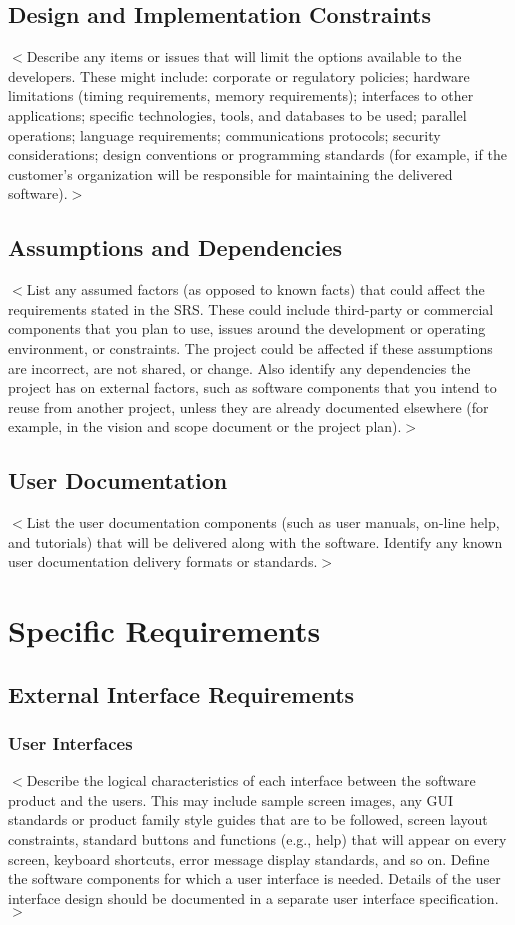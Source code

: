 \documentclass[a4paper, 11pt]{scrreprt}
\begin{document}
\section{Design and Implementation Constraints}
$<$Describe any items or issues that will limit the options available to the 
developers. These might include: corporate or regulatory policies; hardware 
limitations (timing requirements, memory requirements); interfaces to other 
applications; specific technologies, tools, and databases to be used; parallel 
operations; language requirements; communications protocols; security 
considerations; design conventions or programming standards (for example, if the 
customer's organization will be responsible for maintaining the delivered 
software).$>$

\section{Assumptions and Dependencies}
$<$List any assumed factors (as opposed to known facts) that could affect the 
requirements stated in the SRS. These could include third-party or commercial 
components that you plan to use, issues around the development or operating 
environment, or constraints. The project could be affected if these assumptions 
are incorrect, are not shared, or change. Also identify any dependencies the 
project has on external factors, such as software components that you intend to 
reuse from another project, unless they are already documented elsewhere (for 
example, in the vision and scope document or the project plan).$>$

\section{User Documentation}
$<$List the user documentation components (such as user manuals, on-line help, 
and tutorials) that will be delivered along with the software. Identify any 
known user documentation delivery formats or standards.$>$


\chapter{Specific Requirements}

\section{External Interface Requirements}
\subsection{User Interfaces}
$<$Describe the logical characteristics of each interface between the software 
product and the users. This may include sample screen images, any GUI standards 
or product family style guides that are to be followed, screen layout 
constraints, standard buttons and functions (e.g., help) that will appear on 
every screen, keyboard shortcuts, error message display standards, and so on.  
Define the software components for which a user interface is needed. Details of 
the user interface design should be documented in a separate user interface 
specification.$>$
\end{document}
